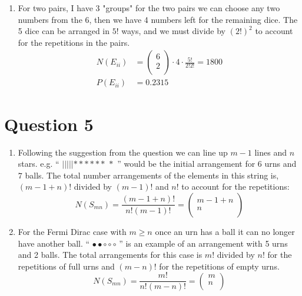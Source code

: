 \documentclass[12pt]{article}
\begin{document}
\begin{enumerate}[label=\alph*)]
\begin{enumerate}
\begin{align*}
\begin{pmatrix}
                 2 \\
            \end{pmatrix} \cdot  6 \cdot  5 \cdot  4 \cdot  3 = 3600\\
            P(E_{i}) &= 0.463
        \end{align*}
        \item[ii)] For two pairs, I have 3 "groups" for the two pairs we can choose any two numbers from the 6, then we have 4 numbers left for the remaining dice. 
        The 5 dice can be arranged in \(5!\) ways, and we must divide by \((2!)^{2} \) to account for the repetitions in the pairs. 
        \begin{align*}
            N(E_{ii}) &= \begin{pmatrix}
                 6 \\
                 2 \\
            \end{pmatrix} \cdot  4 \cdot  \frac{5!}{2!2!} = 1800\\
            P(E_{i i}) &= 0.2315
        \end{align*}
    \end{enumerate}
\end{enumerate}
\section*{Question 5}
\begin{enumerate}
    \item[a)] Following the suggestion from the question we can line up \(m - 1\) lines and \(n\) stars. e.g. `` \(| | | | | * * * * * *\, * \) ''  would be the 
    initial arrangement for \(6\) urns and \(7\) balls. The total number arrangements of the elements in this string is, \((m - 1 + n)!\) divided by \((m - 1)!\) and \(n!\) to 
    account for the repetitions:
    \[
        N(S_{mn}) = \frac{(m - 1 + n)!}{n! (m - 1)!} = \begin{pmatrix}
             m - 1 + n \\
             n \\
        \end{pmatrix}
    \] 
    \item[b)] For the Fermi Dirac case with \(m \geq  n\)  once an urn has a ball it can no longer have another ball. `` \(\bullet \bullet \circ \circ \circ\) '' is an example of an arrangement with 5 urns and 2 balls. 
    The total arrangements for this case is \(m!\) divided by \(n!\) for the repetitions of full urns and \((m - n)!\) for the repetitions of empty urns.  
    \[
        N(S_{mn} ) = \frac{m!}{n!(m - n)!} = \begin{pmatrix}
             m  \\
             n \\
        \end{pmatrix}
    \]
\end{enumerate}

\end{document}
